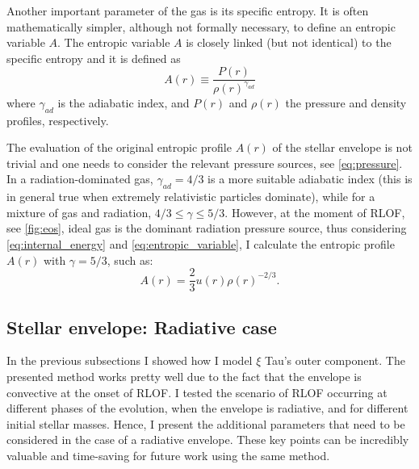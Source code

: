 Another important parameter of the gas is its specific entropy. It is often mathematically simpler, although not formally necessary, to define an entropic variable $A$. The entropic variable $A$ is closely linked (but not identical) to the specific entropy and it is defined as
\begin{equation}\label{eq:entropic_variable}
    A(r) \equiv \frac{P(r)}{\rho(r)^{\gamma_{ad}}}
\end{equation}
where $\gamma_{ad}$ is the adiabatic index, and $P(r)$ and $\rho(r)$ the pressure and density profiles, respectively. 

The evaluation of the original entropic profile $A(r)$ of the stellar envelope is not trivial and one needs to consider the relevant pressure sources, see \cref{eq:pressure}. In a radiation-dominated gas, $\gamma_{ad} = 4/3$ is a more suitable adiabatic index (this is in general true when extremely relativistic particles dominate), while for a mixture of gas and radiation, $4/3 \leq \gamma \leq 5/3$. However, at the moment of RLOF, see \cref{fig:eos}, ideal gas is the dominant radiation pressure source, thus considering \cref{eq:internal_energy} and \cref{eq:entropic_variable}, I calculate the entropic profile $A(r)$ with $\gamma = 5/3$, such as:
\begin{equation}\label{eq:entropic_variable_2}
    A(r) = \frac{2}{3} u(r) \rho(r)^{-2/3}.
\end{equation}

\subsection{Stellar envelope: Radiative case}\label{sub:envelope_rad}

In the previous subsections I showed how I model $\xi$ Tau's outer component. The presented method works pretty well due to the fact that the envelope is convective at the onset of RLOF. I tested the scenario of RLOF occurring at different phases of the evolution, when the envelope is radiative, and for different initial stellar masses. Hence, I present the additional parameters that need to be considered in the case of a radiative envelope. These key points can be incredibly valuable and time-saving for future work using the same method.

